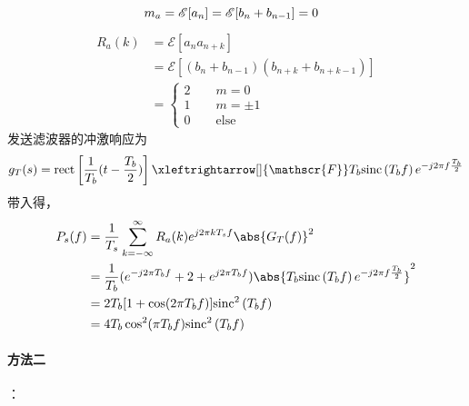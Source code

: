     \vspace{-2ex}
    \begin{equation}
        m_a=\mathscr{E}[a_n]=\mathscr{E}[b_n+b_{n-1}]=0\hspace{0.8em}
    \end{equation}
    \vspace{-6ex}
    \begin{equation}
        \begin{split}
            R_a(k)  &=\mathscr{E}[a_na_{n+k}]\\
                    &=\mathscr{E}[(b_n+b_{n-1})(b_{n+k}+b_{n+k-1})]\\
                    &=\begin{cases}
                        2\hspace{2em}m=0\\
                        1\hspace{2em}m=\pm 1\\
                        0\hspace{2em}\text{else}
                    \end{cases}
        \end{split}
    \end{equation}
    发送滤波器的冲激响应为
    \begin{equation}
        g_T(s)=\text{rect}\left[\frac{1}{T_b}(t-\frac{T_b}{2})\right]\xleftrightarrow[]{\mathscr{F}}T_b\text{sinc}\left(T_bf\right)e^{-j2\pi f\frac{T_b}{2}}
    \end{equation}
    带入得，
    \begin{equation}
        \begin{split}
            P_s(f)  &=\frac{1}{T_s}\sum_{k=-\infty}^{\infty}R_a(k)e^{j2\pi kT_sf}\abs{G_T(f)}^2\\
                    &=\frac{1}{T_b}(e^{-j2\pi T_bf}+2+e^{j2\pi T_bf})\abs{T_b\text{sinc}\left(T_bf\right)e^{-j2\pi f\frac{T_b}{2}}}^2\\
                    &=2T_b[1+\cos(2\pi T_bf)]\text{sinc}^2\left(T_bf\right)\\
                    &=4T_b\cos^2(\pi T_bf)\text{sinc}^2\left(T_bf\right)
        \end{split}
    \end{equation}

    \paragraph{方法二}：

